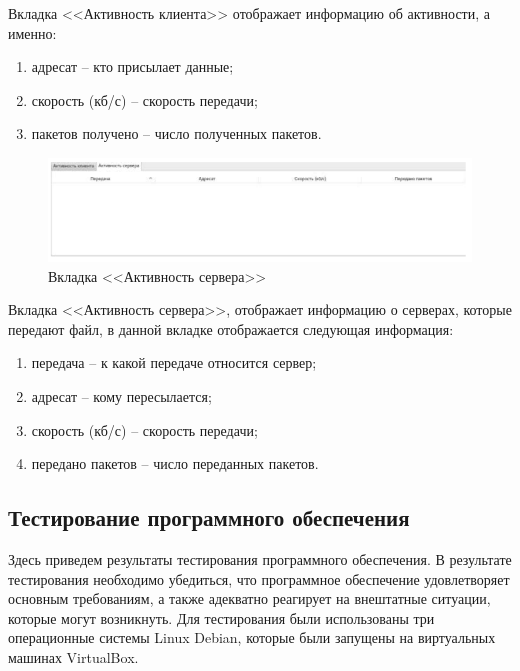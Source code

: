 Вкладка <<Активность клиента>> отображает информацию об активности, а
именно:
\begin{enumerate}
    \item адресат -- кто присылает данные;
    \item скорость (кб/с) -- скорость передачи;
    \item пакетов получено – число полученных пакетов.
\end{enumerate}

\begin{figure}[!hbt]
    \centering
    \includegraphics[width=\textwidth]{srv}
    \caption{Вкладка <<Активность сервера>>}\label{srv_act}
\end{figure}

Вкладка <<Активность сервера>>, отображает информацию о серверах,
которые передают файл, в данной вкладке отображается следующая
информация:
\begin{enumerate}
    \item передача -- к какой передаче относится сервер;
    \item адресат -- кому пересылается;
    \item скорость (кб/с) -- скорость передачи;
    \item передано пакетов -- число переданных пакетов.
\end{enumerate}

\subsection{Тестирование программного обеспечения}
Здесь приведем результаты
 тестирования программного обеспечения. В
 результате тестирования
  необходимо убедиться, что программное
  обеспечение удовлетворяет
   основным требованиям, а также адекватно
   реагирует на внештатные
    ситуации, которые могут возникнуть. Для
    тестирования были использованы три операционные системы Linux Debian,
    которые были запущены на виртуальных машинах VirtualBox.
